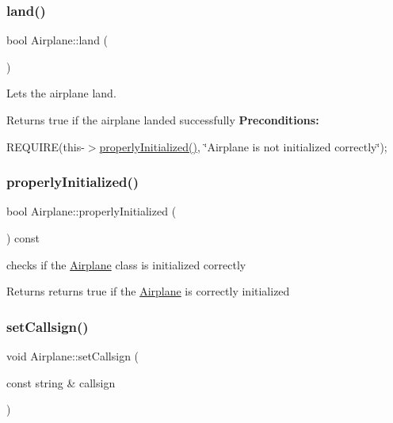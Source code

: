 \subsubsection{\texorpdfstring{land()}{land()}}
{\footnotesize\ttfamily bool Airplane\+::land (\begin{DoxyParamCaption}{ }\end{DoxyParamCaption})}



Lets the airplane land. 

\begin{DoxyReturn}{Returns}
true if the airplane landed successfully {\bfseries Preconditions\+:}
\begin{DoxyItemize}
\item R\+E\+Q\+U\+I\+RE(this-\/$>$\mbox{\hyperlink{class_airplane_a6f80df8f692cc8d67d292c1e9f26d59e}{properly\+Initialized()}}, \char`\"{}\+Airplane is not initialized correctly\char`\"{}); 
\end{DoxyItemize}
\end{DoxyReturn}
\mbox{\label{class_airplane_a6f80df8f692cc8d67d292c1e9f26d59e}} 
\subsubsection{\texorpdfstring{properly\+Initialized()}{properlyInitialized()}}
{\footnotesize\ttfamily bool Airplane\+::properly\+Initialized (\begin{DoxyParamCaption}{ }\end{DoxyParamCaption}) const}



checks if the \mbox{\hyperlink{class_airplane}{Airplane}} class is initialized correctly 

\begin{DoxyReturn}{Returns}
returns true if the \mbox{\hyperlink{class_airplane}{Airplane}} is correctly initialized 
\end{DoxyReturn}
\mbox{\label{class_airplane_aed67dce16e3a4b1c1811e3344a039d90}} 
\subsubsection{\texorpdfstring{set\+Callsign()}{setCallsign()}}
{\footnotesize\ttfamily void Airplane\+::set\+Callsign (\begin{DoxyParamCaption}\item[{const string \&}]{callsign }\end{DoxyParamCaption})}



